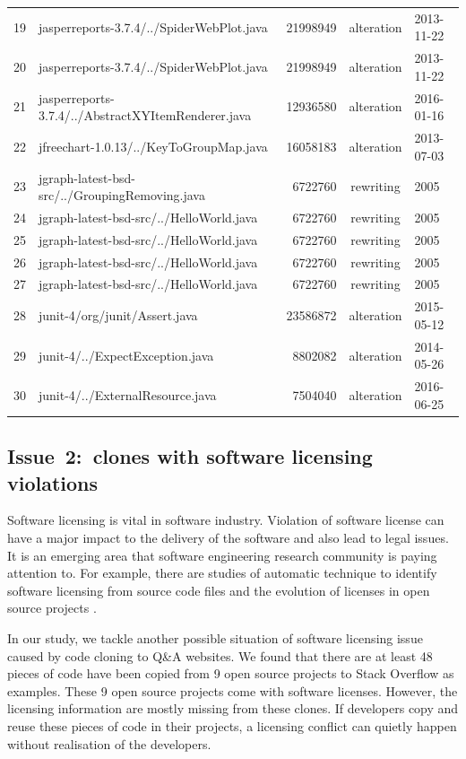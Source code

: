 \documentclass{sig-alternate-05-2015}
\begin{document}
\begin{table}
\begin{tabular}{r|l|r|c|l}
		19 & jasperreports-3.7.4/../SpiderWebPlot.java & 21998949 & alteration & 2013-11-22 \\
		20 & jasperreports-3.7.4/../SpiderWebPlot.java & 21998949 & alteration & 2013-11-22 \\
		21 & jasperreports-3.7.4/../AbstractXYItemRenderer.java & 12936580 & alteration & 2016-01-16 \\
		22 & jfreechart-1.0.13/../KeyToGroupMap.java & 16058183 & alteration & 2013-07-03 \\
		23 & jgraph-latest-bsd-src/../GroupingRemoving.java & 6722760 & rewriting & 2005 \\
		24 & jgraph-latest-bsd-src/../HelloWorld.java & 6722760 & rewriting & 2005 \\
		25 & jgraph-latest-bsd-src/../HelloWorld.java & 6722760 & rewriting & 2005 \\
		26 & jgraph-latest-bsd-src/../HelloWorld.java & 6722760 & rewriting & 2005 \\
		27 & jgraph-latest-bsd-src/../HelloWorld.java & 6722760 & rewriting & 2005 \\
		28 & junit-4/org/junit/Assert.java & 23586872 & alteration & 2015-05-12 \\
		29 & junit-4/../ExpectException.java & 8802082 & alteration & 2014-05-26 \\
		30 & junit-4/../ExternalResource.java & 7504040 & alteration & 2016-06-25 \\
		\hline
	\end{tabular} 
\end{table}

\subsection{Issue~2:~clones with software licensing violations}
Software licensing is vital in software industry. Violation of software license can have a major impact to the delivery of the software and also lead to legal issues. It is an emerging area that software engineering research community is paying attention to. For example, there are studies of automatic technique to identify software licensing from source code files \cite{German2010} and the evolution of licenses in open source projects \cite{DiPenta2010}.

In our study, we tackle another possible situation of software licensing issue caused by code cloning to Q\&A websites. We found that there are at least 48 pieces of code have been copied from 9 open source projects to Stack Overflow as examples. These 9 open source projects come with software licenses. However, the licensing information are mostly missing from these clones. If developers copy and reuse these pieces of code in their projects, a licensing conflict can quietly happen without realisation of the developers. 
\end{document}
